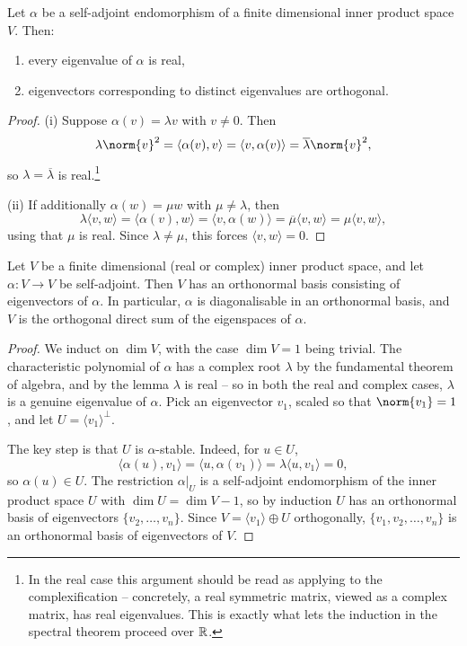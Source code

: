 \documentclass[a4paper]{scrartcl}
\begin{document}
\begin{lemma}
    Let $\alpha$ be a self-adjoint endomorphism of a finite dimensional inner product space $V$. Then:
    \begin{enumerate}[label=(\roman*)]
        \item every eigenvalue of $\alpha$ is real,
        \item eigenvectors corresponding to distinct eigenvalues are orthogonal.
    \end{enumerate}
\end{lemma}
\begin{proof}
    (i) Suppose $\alpha(v) = \lambda v$ with $v \neq 0$. Then
    $$
    \lambda \norm{v}^2 = \langle \alpha(v), v\rangle = \langle v, \alpha( v)\rangle = \overline{\lambda}\norm{v}^2,
    $$
    so $\lambda = \overline{\lambda}$ is real.\footnote{In the real case this argument should be read as applying to the complexification -- concretely, a real symmetric matrix, viewed as a complex matrix, has real eigenvalues. This is exactly what lets the induction in the spectral theorem proceed over $\mathbb{R}$.}

    (ii) If additionally $\alpha(w) = \mu w$ with $\mu \neq \lambda$, then
    $$
    \lambda \langle v, w \rangle = \langle \alpha(v), w\rangle = \langle v, \alpha(w)\rangle = \overline{\mu}\langle v, w \rangle = \mu \langle v, w\rangle,
    $$
    using that $\mu$ is real. Since $\lambda \neq \mu$, this forces $\langle v, w \rangle = 0$.
\end{proof}

\begin{theorem}
    Let $V$ be a finite dimensional (real or complex) inner product space, and let $\alpha: V \rightarrow V$ be self-adjoint. Then $V$ has an orthonormal basis consisting of eigenvectors of $\alpha$. In particular, $\alpha$ is diagonalisable in an orthonormal basis, and $V$ is the orthogonal direct sum of the eigenspaces of $\alpha$.
\end{theorem}
\begin{proof}
    We induct on $\dim V$, with the case $\dim V = 1$ being trivial. The characteristic polynomial of $\alpha$ has a complex root $\lambda$ by the fundamental theorem of algebra, and by the lemma $\lambda$ is real -- so in both the real and complex cases, $\lambda$ is a genuine eigenvalue of $\alpha$. Pick an eigenvector $v_1$, scaled so that $\norm{v_1} = 1$, and let $U = \langle v_1 \rangle^\perp$.

    The key step is that $U$ is $\alpha$-stable. Indeed, for $u \in U$,
    $$
    \langle \alpha(u), v_1 \rangle = \langle u, \alpha(v_1)\rangle = \lambda \langle u, v_1 \rangle = 0,
    $$
    so $\alpha(u) \in U$. The restriction $\alpha|_U$ is a self-adjoint endomorphism of the inner product space $U$ with $\dim U = \dim V - 1$, so by induction $U$ has an orthonormal basis of eigenvectors $\{v_2, \dots, v_n\}$. Since $V = \langle v_1 \rangle \oplus U$ orthogonally, $\{v_1, v_2, \dots, v_n\}$ is an orthonormal basis of eigenvectors of $V$.
\end{proof}
\end{document}
